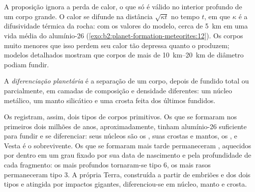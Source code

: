 \begin{omfigure}
\par{}
\end{omfigure}

A proposição ignora a perda de calor, o que só é válido no interior profundo de um corpo grande.
O calor se difunde na distância $\sqrt{\kappa t}$ no tempo $t$, em que
$\kappa$ é a difusividade térmica da rocha: com os valores do modelo,
cerca de \qty{5}{km} em uma vida média do alumínio-26 (\cref{exo:b2:planet-formation-meteorites:12}). Os corpos muito
menores que isso perdem seu calor tão depressa quanto o produzem; modelos detalhados mostram
que corpos de mais de \qtyrange{10}{20}{km} de diâmetro podiam fundir.

\begin{definition}
\label{def:b2:planet-formation-meteorites:differentiation}
A \emph{diferenciação planetária} é a
separação de um corpo, depois de fundido total ou parcialmente, em camadas de
composição e densidade diferentes: um núcleo metálico, um manto silicático e uma crosta feita
dos últimos fundidos.
\end{definition}

Os  registram, assim, dois tipos de corpos primitivos. Os que se formaram nos
primeiros dois milhões de anos, aproximadamente, tinham alumínio-26 suficiente para fundir e
se diferenciar: seus núcleos são os , suas crostas e mantos,
os , e Vesta é o sobrevivente. Os que se formaram mais tarde permaneceram
, aquecidos por dentro em um grau fixado por sua data de nascimento e pela
profundidade de cada fragmento: os mais profundos tornaram-se tipo 6, os mais rasos permaneceram
tipo 3. A própria Terra, construída a partir de embriões e  dos dois tipos e
atingida por impactos gigantes, diferenciou-se em núcleo, manto e crosta.


